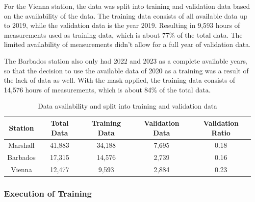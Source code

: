 For the Vienna station, the data was split into training and validation data based on the availability of the data. The training data consists of all available data up to 2019, while the validation data is the year 2019. Resulting in 9,593 hours of measurements used as training data, which is about 77\% of the total data. The limited availability of measurements didn't allow for a full year of validation data.

The Barbados station also only had 2022 and 2023 as a complete available years, so that the decision to use the available data of 2020 as a training was a result of the lack of data as well. With the mask applied, the training data consists of 14,576 hours of measurements, which is about 84\% of the total data.






\begin{table}
\centering
\begin{tabular}{|c|c|c|c|c|}
\hline
Station & Total Data & Training Data & Validation Data & Validation Ratio \\
\hline
Marshall & 41,883 & 34,188 & 7,695 & 0.18 \\
Barbados & 17,315 & 14,576 & 2,739 & 0.16 \\
Vienna & 12,477 & 9,593 & 2,884 & 0.23 \\
\hline
\end{tabular}
\caption{Data availability and split into training and validation data}
\label{tab:data_split}
\end{table}

\subsubsection*{Execution of Training}

